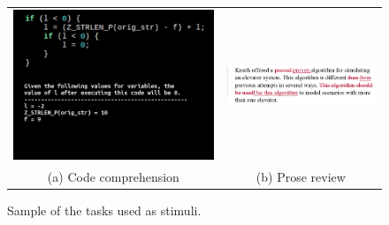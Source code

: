 \begin{figure}[H]
    \centering
    \begin{tabular}{cc}
        \includegraphics[trim=25 160 0 0,clip,width=0.45\linewidth]{img/final-1-1.png}
        &
        \includegraphics[trim=20 0 20 0,clip,width=0.45\linewidth]{img/bugs_1.PNG}
        \\
        (a) Code comprehension
        &
        (b) Prose review
    \end{tabular}
    \caption{Sample of the tasks used as stimuli.}\label{fig:tasks}
\end{figure}
